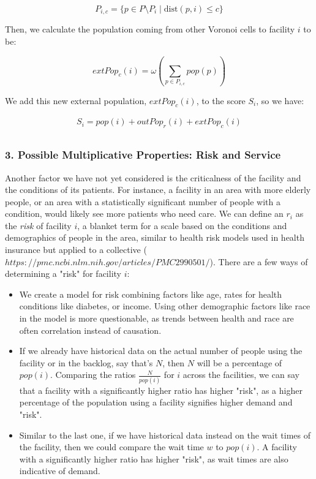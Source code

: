 \documentclass{article}
\begin{document}
$$
P_{i, c} = \{p \in P \setminus P_i \mid \mathrm{dist}(p, i) \leq c\}
$$

Then, we calculate the population coming from other Voronoi cells to facility $i$ to be:

$$
extPop_c(i) = \omega\left(\sum_{p \in P_{i, c}} pop(p)\right)
$$

We add this new external population, $extPop_c (i)$, to the score $S_i$, so we have:

\begin{gather*}
    S_i = pop(i) + outPop_r(i) + extPop_c(i)\\
\end{gather*}

\subsubsection*{3. Possible Multiplicative Properties: Risk and Service}

Another factor we have not yet considered is the criticalness of the facility and the conditions of its patients. For instance, a facility in an area with more elderly people, or an area with a statistically significant number of people with a condition, would likely see more patients who need care. We can define an $r_i$ as the \textit{risk} of facility $i$, a blanket term for a scale based on the conditions and demographics of people in the area, similar to 
health risk models used in health insurance but applied to a collective ($https://pmc.ncbi.nlm.nih.gov/articles/PMC2990501/$). There are a few ways of determining a "risk" for facility $i$:

\begin{itemize}
    \item We create a model for risk combining factors like age,  rates for health conditions like diabetes, or income. Using other demographic factors like race in the model is more questionable, as trends between health and race are often correlation instead of causation. 
    \item If we already have historical data on the actual number of people using the facility or in the backlog, say that's $N$, then $N$ will be a percentage of $pop(i)$. Comparing the ratios $\frac{N}{pop(i)}$ for $i$ across the facilities, we can say that a facility with a significantly higher ratio has higher "risk", as a higher percentage of the population using a facility signifies higher demand and "risk".
    \item Similar to the last one, if we have historical data instead on the wait times of the facility, then we could compare the wait time $w$ to $pop(i)$. A facility with a significantly higher ratio has higher "risk", as wait times are also indicative of demand.
\end{itemize}
\end{document}
